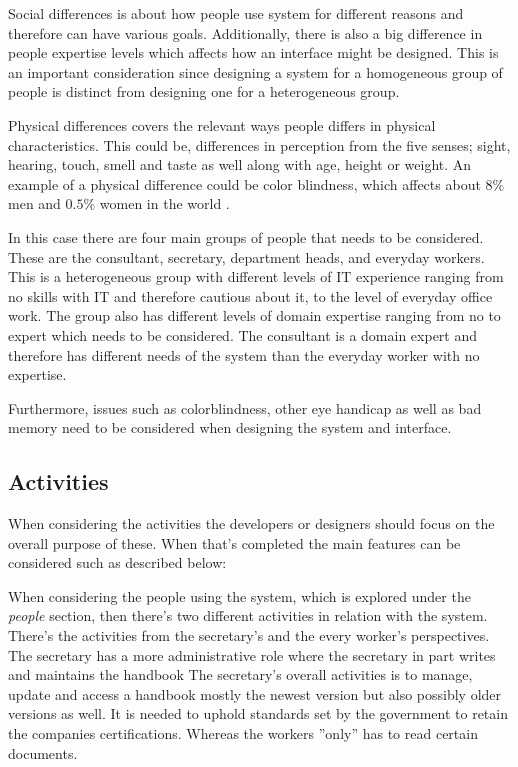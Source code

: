 Social differences is about how people use system for different reasons and therefore can have various goals. 
Additionally, there is also a big difference in people expertise levels which affects how an interface might be designed.
This is an important consideration since designing a system for a homogeneous group of people is  distinct from designing one for a heterogeneous group. \citep{Benyon}

Physical differences covers the relevant ways people differs in physical characteristics.
This could be, differences in perception from the five senses; sight, hearing, touch, smell and taste as well along with age, height or weight. An example of a physical difference could be color blindness, which affects about $8\%$ men and $0.5\%$ women in the world \cite{ColourBlind}.

In this case there are four main groups of people that needs to be considered. These are the consultant, secretary, department heads, and everyday workers. 
This is a heterogeneous group with different levels of IT experience ranging from no skills with IT and therefore cautious about it, to the level of everyday office work.
The group also has different levels of domain expertise ranging from no to expert which needs to be considered. 
The consultant is a domain expert and therefore has different needs of the system than the everyday worker with no expertise.

Furthermore, issues such as colorblindness, other eye handicap as well as bad memory need to be considered when designing the system and interface.

\subsection{Activities}
When considering the activities the developers or designers should focus on the overall purpose of these. When that's completed the main features can be considered such as described below:

When considering the people using the system, which is explored under the \textit{people} section, then there's two different activities in relation with the system.
There's the activities from the secretary's and the every worker's perspectives.
The secretary has a more administrative role where the secretary in part writes and maintains the handbook
The secretary's overall activities is to manage, update and access a handbook mostly the newest version but also possibly older versions as well. 
It is needed to uphold standards set by the government to retain the companies certifications.
Whereas the workers ''only'' has to read certain documents. 

